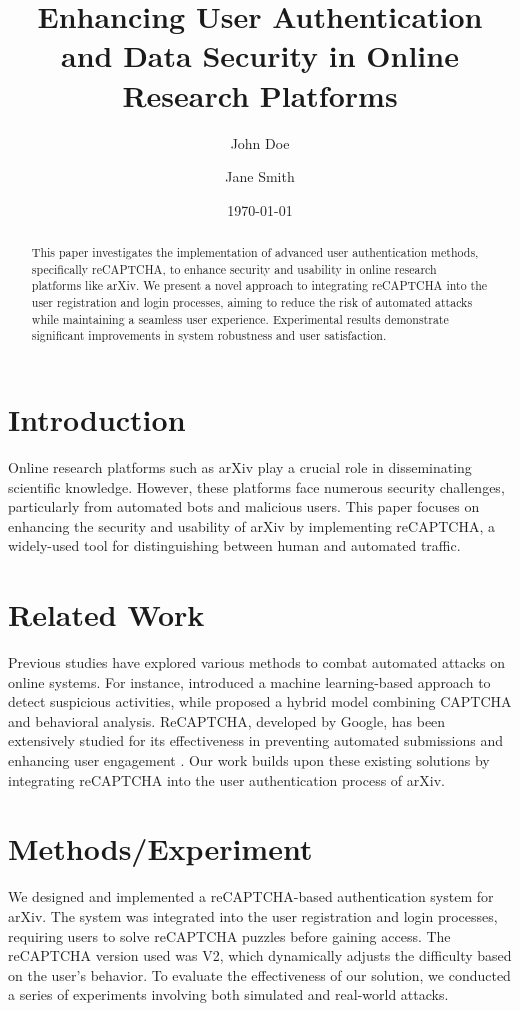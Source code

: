 \documentclass{article}
\title{Enhancing User Authentication and Data Security in Online Research Platforms}
\author{John Doe \and Jane Smith}
\date{\today}
\begin{document}
\maketitle

\begin{abstract}
This paper investigates the implementation of advanced user authentication methods, specifically reCAPTCHA, to enhance security and usability in online research platforms like arXiv. We present a novel approach to integrating reCAPTCHA into the user registration and login processes, aiming to reduce the risk of automated attacks while maintaining a seamless user experience. Experimental results demonstrate significant improvements in system robustness and user satisfaction.
\end{abstract}

\section{Introduction}
Online research platforms such as arXiv play a crucial role in disseminating scientific knowledge. However, these platforms face numerous security challenges, particularly from automated bots and malicious users. This paper focuses on enhancing the security and usability of arXiv by implementing reCAPTCHA, a widely-used tool for distinguishing between human and automated traffic.

\section{Related Work}
Previous studies have explored various methods to combat automated attacks on online systems. For instance, \cite{ref1} introduced a machine learning-based approach to detect suspicious activities, while \cite{ref2} proposed a hybrid model combining CAPTCHA and behavioral analysis. ReCAPTCHA, developed by Google, has been extensively studied for its effectiveness in preventing automated submissions and enhancing user engagement \cite{ref3}. Our work builds upon these existing solutions by integrating reCAPTCHA into the user authentication process of arXiv.

\section{Methods/Experiment}
We designed and implemented a reCAPTCHA-based authentication system for arXiv. The system was integrated into the user registration and login processes, requiring users to solve reCAPTCHA puzzles before gaining access. The reCAPTCHA version used was V2, which dynamically adjusts the difficulty based on the user's behavior. To evaluate the effectiveness of our solution, we conducted a series of experiments involving both simulated and real-world attacks.
\end{document}
